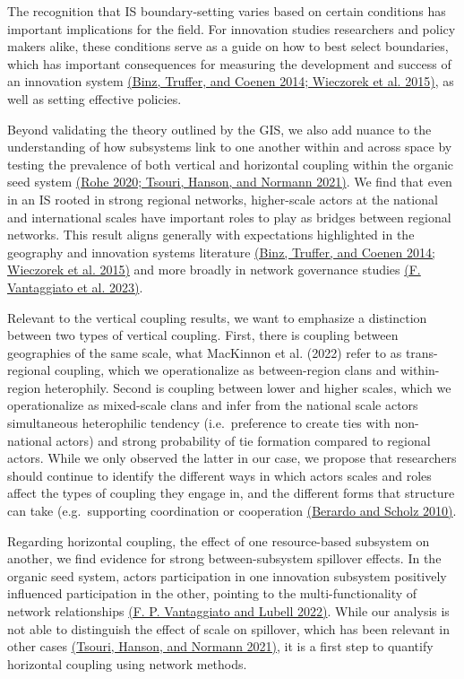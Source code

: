 \documentclass[twoside,12pt,final]{ucthesis-CA2012}
\begin{document}
\begin{ucmainmatter}
The recognition that IS boundary-setting varies based on certain
conditions has important implications for the field. For innovation
studies researchers and policy makers alike, these conditions serve as a
guide on how to best select boundaries, which has important consequences
for measuring the development and success of an innovation system
\href{https://www.zotero.org/google-docs/?FkVEuz}{(Binz, Truffer, and Coenen 2014; Wieczorek et al.
2015)}, as well as setting
effective policies.

Beyond validating the theory outlined by the GIS, we also add nuance to
the understanding of how subsystems link to one another within and
across space by testing the prevalence of both vertical and horizontal
coupling within the organic seed system \href{https://www.zotero.org/google-docs/?FA9llw}{(Rohe 2020; Tsouri, Hanson, and
Normann 2021)}. We find that
even in an IS rooted in strong regional networks, higher-scale actors at
the national and international scales have important roles to play as
bridges between regional networks. This result aligns generally with
expectations highlighted in the geography and innovation systems
literature \href{https://www.zotero.org/google-docs/?HxZeff}{(Binz, Truffer, and Coenen 2014; Wieczorek et al.
2015)} and more broadly in
network governance studies \href{https://www.zotero.org/google-docs/?CztUC8}{(F. Vantaggiato et al.
2023)}.

Relevant to the vertical coupling results, we want to emphasize a
distinction between two types of vertical coupling. First, there is
coupling between geographies of the same scale, what MacKinnon et al.
(2022) refer to as trans-regional coupling, which we operationalize as
between-region clans and within-region heterophily. Second is coupling
between lower and higher scales, which we operationalize as mixed-scale
clans and infer from the national scale actors\textquotesingle{} simultaneous
heterophilic tendency (i.e.~preference to create ties with non-national
actors) and strong probability of tie formation compared to regional
actors. While we only observed the latter in our case, we propose that
researchers should continue to identify the different ways in which
actors\textquotesingle{} scales and roles affect the types of coupling they engage in,
and the different forms that structure can take (e.g.~supporting
coordination or cooperation \href{https://www.zotero.org/google-docs/?AdbMHu}{(Berardo and Scholz
2010)}.

Regarding horizontal coupling, the effect of one resource-based
subsystem on another, we find evidence for strong between-subsystem
spillover effects. In the organic seed system, actors\textquotesingle{} participation in
one innovation subsystem positively influenced participation in the
other, pointing to the multi-functionality of network relationships \href{https://www.zotero.org/google-docs/?ntgWIs}{(F.
P. Vantaggiato and Lubell
2022)}. While our analysis
is not able to distinguish the effect of scale on spillover, which has
been relevant in other cases \href{https://www.zotero.org/google-docs/?gqOuM4}{(Tsouri, Hanson, and Normann
2021)}, it is a first step
to quantify horizontal coupling using network methods.


\end{ucmainmatter}
\end{document}
